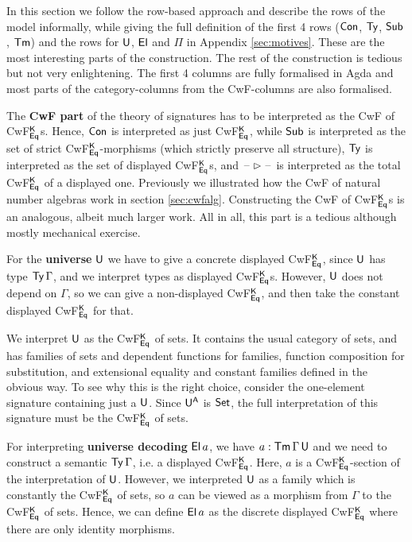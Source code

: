 \documentclass[acmsmall,review,anonymous]{acmart}\settopmatter{printfolios=true,printccs=false,printacmref=false}
\begin{document}
In this section we follow the row-based approach and describe the rows
of the model informally, while giving the full definition of the first
4 rows ($\mathsf{Con}$, $\mathsf{Ty}$, $\mathsf{Sub}$, $\mathsf{Tm}$) and the rows for $\mathsf{U}$, $\mathsf{El}$ and
$\Pi$ in Appendix \ref{sec:motives}. These are the most interesting
parts of the construction. The rest of the construction is tedious but
not very enlightening. The first 4 columns are fully formalised in
Agda and most parts of the category-columns from the CwF-columns are
also formalised.

The \textbf{CwF part} of the theory of signatures has to be
interpreted as the CwF of CwF$^{\mathsf{K}}_{\mathsf{Eq}}$s. Hence, $\mathsf{Con}$ is
interpreted as just CwF$^{\mathsf{K}}_{\mathsf{Eq}}$, while $\mathsf{Sub}$ is interpreted as the
set of strict CwF$^{\mathsf{K}}_{\mathsf{Eq}}$-morphisms (which strictly preserve all
structure), $\mathsf{Ty}$ is interpreted as the set of displayed
CwF$^{\mathsf{K}}_{\mathsf{Eq}}$s, and $\mathord{\hspace{1pt}\text{--}\hspace{1pt}}\rhd\mathord{\hspace{1pt}\text{--}\hspace{1pt}}$ is interpreted as the total
CwF$^{\mathsf{K}}_{\mathsf{Eq}}$ of a displayed one. Previously we illustrated how the
CwF of natural number algebras work in section
\ref{sec:cwfalg}. Constructing the CwF of CwF$^{\mathsf{K}}_{\mathsf{Eq}}$s is an
analogous, albeit much larger work. All in all, this part is a tedious
although mostly mechanical exercise.

For the \textbf{universe} $\mathsf{U}$ we have to give a concrete displayed
CwF$^{\mathsf{K}}_{\mathsf{Eq}}$, since $\mathsf{U}$ has type $\mathsf{Ty}\,\Gamma$, and we interpret
types as displayed CwF$^{\mathsf{K}}_{\mathsf{Eq}}$s.  However, $\mathsf{U}$ does not depend on
$\Gamma$, so we can give a non-displayed CwF$^{\mathsf{K}}_{\mathsf{Eq}}$, and then take
the constant displayed CwF$^{\mathsf{K}}_{\mathsf{Eq}}$ for that.

We interpret $\mathsf{U}$ as the CwF$^{\mathsf{K}}_{\mathsf{Eq}}$ of sets. It contains the
usual category of sets, and has families of sets and dependent
functions for families, function composition for substitution, and
extensional equality and constant families defined in the obvious way.
To see why this is the right choice, consider the one-element
signature containing just a $\mathsf{U}$. Since $\mathsf{U}^{\mathsf{A}}$ is $\mathsf{Set}$, the full
interpretation of this signature must be the CwF$^{\mathsf{K}}_{\mathsf{Eq}}$ of sets.

For interpreting \textbf{universe decoding} $\mathsf{El}\,a$, we have $a :
\mathsf{Tm}\,\Gamma\,\mathsf{U}$ and we need to construct a semantic $\mathsf{Ty}\,\Gamma$,
i.e. a displayed CwF$^{\mathsf{K}}_{\mathsf{Eq}}$. Here, $a$ is a CwF$^{\mathsf{K}}_{\mathsf{Eq}}$-section
of the interpretation of $\mathsf{U}$. However, we interpreted $\mathsf{U}$ as a
family which is constantly the CwF$^{\mathsf{K}}_{\mathsf{Eq}}$ of sets, so $a$ can be
viewed as a morphism from $\Gamma$ to the CwF$^{\mathsf{K}}_{\mathsf{Eq}}$ of
sets. Hence, we can define $\mathsf{El}\,a$ as the discrete
displayed CwF$^{\mathsf{K}}_{\mathsf{Eq}}$ where there are only identity morphisms.
\end{document}
